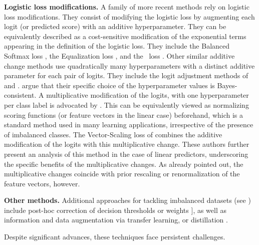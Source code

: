 \textbf{Logistic loss modifications.}  A family of more recent methods
rely on logistic loss modifications.  They consist of modifying the
logistic loss by augmenting each logit (or predicted score) with an
additive hyperparameter.  They can be equivalently described as a
cost-sensitive modification of the exponential terms appearing in the
definition of the logistic loss.  They include the Balanced Softmax
loss \cite{jiawei2020balanced}, the Equalization loss
\cite{tan2020equalization}, and the \LDAM\ loss
\cite{cao2019learning}. Other similar additive change methods use
quadratically many hyperparameters with a distinct additive parameter
for each pair of logits. They include the logit adjustment methods of
\citet{menon2020long} and \citet{khan2019striking}.
\citet{menon2020long} argue that their specific choice of the
hyperparameter values is Bayes-consistent.
%
A multiplicative modification of the logits, with one hyperparameter
per class label is advocated by \citet{Ye:2020}. This can be
equivalently viewed as normalizing scoring functions (or feature
vectors in the linear case) beforehand, which is a standard method
used in many learning applications, irrespective of the presence of
imbalanced classes. The Vector-Scaling loss of \citet{kini2021label}
combines the additive modification of the logits with this
multiplicative change. These authors further present an analysis of
this method in the case of linear predictors, underscoring the
specific benefits of the multiplicative changes.  As already pointed
out, the multiplicative changes coincide with prior rescaling or
renormalization of the feature vectors, however.

\textbf{Other methods.} Additional approaches for tackling imbalanced
datasets (see \citet{ZhangKangHooiYanFeng2023}) include post-hoc
correction of decision thresholds \citep{Fawcett:1996,Collell:2016} or
weights \citep{kang2019decoupling,Kim:2019}], as well as information and data
  augmentation via transfer learning, or
  distillation \citep{LiLiYeZhang2024}.

Despite significant advances, these techniques face persistent
challenges.

